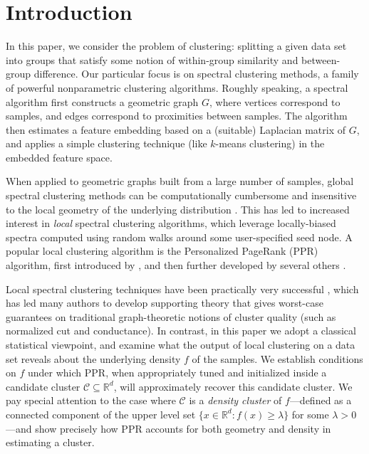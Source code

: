 \documentclass[11pt,twoside]{article}
\newcommand{\Reals}{\mathbb{R}}
\newcommand{\1}{\mathbf{1}}
\newcommand{\Rd}{\Reals^d}
\newcommand{\mc}[1]{\mathcal{#1}}
\begin{document}
\section{Introduction}
In this paper, we consider the problem of clustering: splitting a given data set
into groups that satisfy some notion of within-group similarity and
between-group difference.  Our particular focus is on spectral clustering
methods, a family of powerful nonparametric clustering algorithms. Roughly
speaking, a spectral algorithm first constructs a geometric graph $G$, where
vertices correspond to samples, and edges correspond to proximities between
samples. The algorithm then estimates a feature embedding based on a (suitable) Laplacian matrix of $G$, and applies a simple clustering technique
(like $k$-means clustering) in the embedded feature space.

When applied to geometric graphs built from a large number of samples, global
spectral clustering methods can be computationally cumbersome and insensitive to
the local geometry of the underlying distribution
\citep{leskovec2010,mahoney2012}.  This has led to increased interest in
\emph{local} spectral clustering algorithms, which leverage locally-biased
spectra computed using random walks around some user-specified seed node.  A
popular local clustering algorithm is the Personalized PageRank (PPR) algorithm,
first introduced by \citet{haveliwala2003}, and then further developed by
several others
\citep{spielman2011,spielman2014,andersen2006,mahoney2012,zhu2013}.  

Local spectral clustering techniques have been practically very successful
\citep{leskovec2010,andersen2012,gleich2012,mahoney2012,wu2012}, which has led
many authors to develop supporting theory
\citep{spielman2013,andersen2009,gharan2012,zhu2013} that gives worst-case
guarantees on traditional graph-theoretic notions of cluster quality (such as normalized cut and conductance). In contrast, in this paper we adopt a classical statistical viewpoint, and examine what the output of local clustering on a data set reveals about the underlying density $f$ of the samples. We establish conditions on $f$ under which PPR, when appropriately tuned and initialized inside a candidate cluster $\mc{C} \subseteq \Rd$, will approximately recover this candidate cluster. We pay special attention to the case where $\mc{C}$ is a \emph{density cluster} of $f$---defined as a connected component of the upper level set $\{x \in \Rd : f(x) \geq \lambda\}$ for some $\lambda > 0$---and show precisely how PPR accounts for both geometry and density in estimating a cluster.
\end{document}
